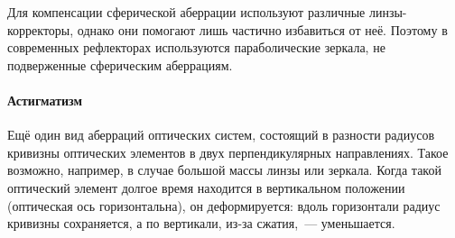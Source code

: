 Для компенсации сферической аберрации используют различные линзы-коррек\-торы, однако они помогают лишь частично избавиться от неё. Поэтому в современных рефлекторах используются параболические зеркала, не подверженные сферическим аберрациям.


\paragraph{Астигматизм} Ещё один вид аберраций оптических систем, состоящий в разности радиусов кривизны оптических элементов в двух перпендикулярных направлениях. Такое возможно, например, в случае большой массы линзы или зеркала. Когда такой оптический элемент долгое время находится в вертикальном положении (оптическая ось горизонтальна), он деформируется: вдоль горизонтали радиус кривизны сохраняется, а по вертикали, из-за сжатия,~--- уменьшается.


